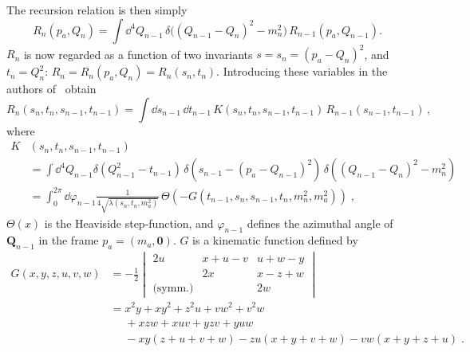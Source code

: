 The recursion relation is then simply
\begin{equation}
    \label{eq:recursion-momentum-transfer}
    R_n(p_a, Q_n) = \int \dd^4 Q_{n-1} \,
        \delta
        \big(
            (Q_{n-1} - Q_n)^2 - m_n^2    
        \big) \, 
        R_{n-1}(p_a, Q_{n-1}) .
\end{equation}
$R_n$ is now regarded as a function of two invariants $s = s_n = (p_a - Q_n)^2$, and $t_n = Q_n^2$: $R_n = R_n(p_a, Q_n) = R_n(s_n, t_n)$. 
Introducing these variables in  the authors of~\cite{Byckling:1969sx} obtain
\begin{equation}
    \label{eq:recursive-momentum-transfer-s-n}
    R_n(s_n, t_n, s_{n-1}, t_{n-1}) = \int \dd s_{n-1} \, \dd t_{n-1} \, 
        K(s_n, t_n, s_{n-1}, t_{n-1}) \, R_{n-1}(s_{n-1}, t_{n-1}) \, ,
\end{equation}
where
\begin{equation}
    \label{eq:recursive-momentum-transfer-k}
    \begin{aligned}
        K&(s_n, t_n, s_{n-1}, t_{n-1}) \\
        & = \int \dd^4 Q_{n-1} \delta(Q^2_{n-1} - t_{n-1}) \, \delta(s_{n-1} - (p_a - Q_{n-1})^2) \, \delta ( (Q_{n-1} - Q_n)^2 - m_n^2) \\
        & = \int_0^{2\pi} \dd \varphi_{n-1} 
            \frac{1}{4 \sqrt{\lambda(s_n, t_n, m_a^2)}} \, 
            \Theta(- G(t_{n-1}, s_n, s_{n-1}, t_n, m_n^2, m_a^2)) \; ,
    \end{aligned}
\end{equation}
$\Theta(x)$ is the Heaviside step-function, and
$\varphi_{n-1}$ defines the azimuthal angle of $\bm{Q}_{n-1}$ in the frame $p_a = (m_a, \bm{0})$. $G$ is a kinematic function defined by
\begin{equation}
    \begin{aligned}
        \label{eq:G-defn}
        G(x,y,z,u,v,w) & = -\frac{1}{2}
        \begin{vmatrix}
            2 u & x + u - v & u + w - y \\
             & 2x & x - z + w \\
            \text{(symm.)} &  & 2w
        \end{vmatrix} \\
        & = x^2 y + xy^2 + z^2 u + v w^2 + v^2 w \\
        & \phantom{=} + xzw + xuv + yzv + yuw \\
        & \phantom{=} - xy(z + u + v + w) - zu (x + y + v + w) - vw(x + y + z + u) \; .
    \end{aligned}
\end{equation}
